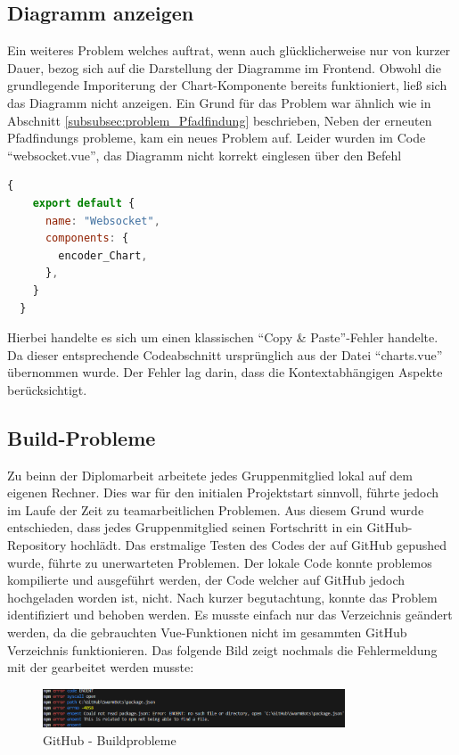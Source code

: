 \subsection{Diagramm anzeigen}
\label{subsubsec:problem_chart_anzeige}
Ein weiteres Problem welches auftrat, wenn auch glücklicherweise nur von kurzer Dauer,
bezog sich auf die Darstellung der Diagramme im Frontend.
%
Obwohl die grundlegende Imporiterung der Chart-Komponente bereits funktioniert, 
ließ sich das Diagramm nicht anzeigen.
%
Ein Grund für das Problem war ähnlich wie in Abschnitt \ref{subsubsec:problem_Pfadfindung} beschrieben,
%
Neben der erneuten Pfadfindungs probleme, kam ein neues Problem auf. 
Leider wurden im Code ``websocket.vue'', das Diagramm nicht korrekt einglesen über den Befehl
\begin{lstlisting}[language=JavaScript, gobble=4]
  {
    export default {
      name: "Websocket",
      components: {
        encoder_Chart,
      },
    }
  }
\end{lstlisting}
Hierbei handelte es sich um einen klassischen ``Copy \& Paste''-Fehler handelte.
Da dieser entsprechende Codeabschnitt ursprünglich aus der Datei ``charts.vue'' übernommen wurde.
%
Der Fehler lag darin, dass die Kontextabhängigen Aspekte berücksichtigt. 

\subsection{Build-Probleme}
\label{subsubsec:problem_Builden}
Zu beinn der Diplomarbeit arbeitete jedes Gruppenmitglied lokal auf dem eigenen Rechner.
%
Dies war für den initialen Projektstart sinnvoll, 
führte jedoch im Laufe der Zeit zu teamarbeitlichen Problemen. 
%
Aus diesem Grund wurde entschieden, dass jedes Gruppenmitglied seinen Fortschritt 
in ein GitHub-Repository hochlädt. 
%
Das erstmalige Testen des Codes der auf GitHub gepushed wurde, führte zu unerwarteten Problemen.
Der lokale Code konnte problemos kompilierte und ausgeführt werden, 
der Code welcher auf GitHub jedoch hochgeladen worden ist, nicht.
%
Nach kurzer begutachtung, konnte das Problem identifiziert und behoben werden.
Es musste einfach nur das Verzeichnis geändert werden, 
da die gebrauchten Vue-Funktionen nicht im gesammten GitHub Verzeichnis funktionieren.
%
Das folgende Bild zeigt nochmals die Fehlermeldung mit der gearbeitet werden musste:
\begin{figure}[H]
  \includegraphics[width=0.8\textwidth, center]{img/GitHub_Buildprobleme.png}
  \caption{GitHub - Buildprobleme}
  \label{fig:GitHub_Buildprobleme}
\end{figure}

